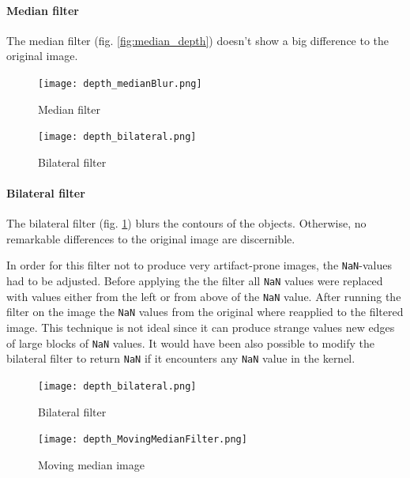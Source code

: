 \documentclass[DIV12,a4paper]{scrartcl}
\begin{document}
\paragraph{Median filter}
The median filter (fig. \ref{fig:median_depth}) doesn't show a big difference to the original image.
\begin{figure}[h!tbp]
  \begin{minipage}{.5\textwidth}
  \centering
  \texttt{[image: depth\_medianBlur.png]}
  \caption{Median filter}
  \label{fig:median_depth}
\end{minipage}%
\begin{minipage}{.5\textwidth}
  \centering
  \texttt{[image: depth\_bilateral.png]}
  \caption{Bilateral filter}
  \label{fig:bilateral_depth}
\end{minipage}
\end{figure}

\paragraph{Bilateral filter}
The bilateral filter (fig. \ref{fig:bilateral_depth}) blurs the contours of the objects. Otherwise, no remarkable differences to the original image are discernible.\par
In order for this filter not to produce very artifact-prone images, the \texttt{NaN}-values had to be adjusted. Before applying the the filter all \texttt{NaN} values were replaced with values either from the left or from above of the \texttt{NaN} value. After running the filter on the image the \texttt{NaN} values from the original where reapplied to the filtered image. This technique is not ideal since it can produce strange values new edges of large blocks of \texttt{NaN} values. It would have been also possible to modify the bilateral filter to return \texttt{NaN} if it encounters any \texttt{NaN} value in the kernel. %
\begin{figure}[h!tbp]
  \begin{minipage}{.5\textwidth}
    \centering
    \texttt{[image: depth\_bilateral.png]}
    \caption{Bilateral filter}
    \label{fig:bilateral_depth}
  \end{minipage}%
  \begin{minipage}{.5\textwidth}
    \centering
    \texttt{[image: depth\_MovingMedianFilter.png]}
    \caption{Moving median image}
    \label{fig:moving_median_depth}
  \end{minipage}
\end{figure}
\end{document}
